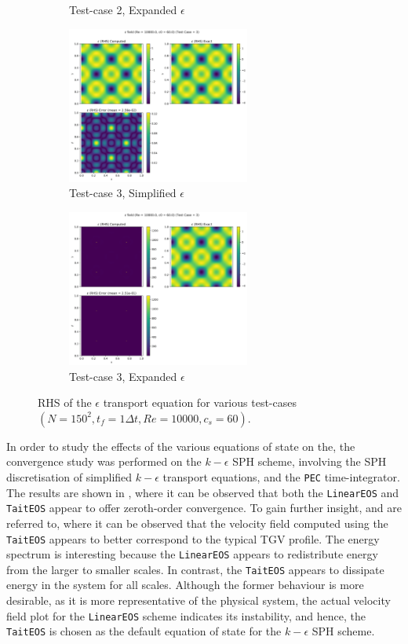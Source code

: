 \begin{figure}[htbp!]
\begin{subfigure}{7cm}
    \caption{Test-case 2, Expanded $\epsilon$}
  \end{subfigure}
  \begin{subfigure}{7cm}
    \centering\includegraphics[width=6cm]{Code-Figures/keps/keps-op-conv/c0_60_ke_expd_no_ketc_3_nx_150_re_10000/eps_rhs.png}
    \caption{Test-case 3, Simplified $\epsilon$}
  \end{subfigure}
  \begin{subfigure}{7cm}
    \centering\includegraphics[width=6cm]{Code-Figures/keps/keps-op-conv/c0_60_ke_expd_yes_ketc_3_nx_150_re_10000/eps_rhs.png}
    \caption{Test-case 3, Expanded $\epsilon$}
  \end{subfigure}
  \caption{RHS of the $\epsilon$ transport equation for various test-cases $(N=150^2, t_f=1\Delta t, Re=10000, c_s=60)$.}
  \label{fig:eps-spatial-ooc-field}
\end{figure}


In order to study the effects of the various equations of state on the, the convergence study was performed on the $k-\epsilon$ SPH scheme, involving the SPH discretisation of simplified $k-\epsilon$ transport equations, and the \texttt{PEC} time-integrator.
The results are shown in , where it can be observed that both the \texttt{LinearEOS} and \texttt{TaitEOS} appear to offer zeroth-order convergence.
To gain further insight,  and  are referred to, where it can be observed that the velocity field computed using the \texttt{TaitEOS} appears to better correspond to the typical TGV profile.
The energy spectrum is interesting because the \texttt{LinearEOS} appears to redistribute energy from the larger to smaller scales. In contrast, the \texttt{TaitEOS} appears to dissipate energy in the system for all scales.
Although the former behaviour is more desirable, as it is more representative of the physical system, the actual velocity field plot for the \texttt{LinearEOS} scheme indicates its instability, and hence, the \texttt{TaitEOS} is chosen as the default equation of state for the $k-\epsilon$ SPH scheme.

